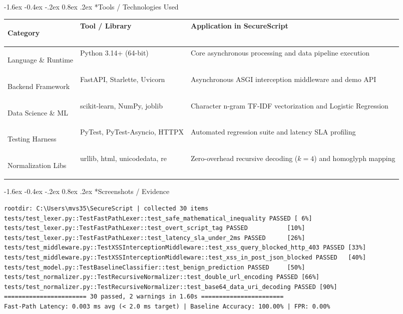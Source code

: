\documentclass[11pt,a4paper]{article}
\makeatletter
\renewcommand{\section}{\@startsection{section}{1}{\z@}%
  {-1.6ex \@plus -0.4ex \@minus -.2ex}%
  {0.8ex \@plus .2ex}%
  {\normalfont\large\bfseries\color{primaryblue}}}
\makeatother
\begin{document}
\section*{Tools / Technologies Used}
\begin{table}[htbp]
\centering
\footnotesize
\begin{tabularx}{\textwidth}{>{\bfseries\raggedright\arraybackslash}p{2.8cm} >{\raggedright\arraybackslash}p{3.8cm} >{\raggedright\arraybackslash}X}
\toprule
\textbf{Category} & \textbf{Tool / Library} & \textbf{Application in SecureScript} \\
\midrule
Language \& Runtime & Python 3.14+ (64-bit) & Core asynchronous processing and data pipeline execution \\
Backend Framework & FastAPI, Starlette, Uvicorn & Asynchronous ASGI interception middleware and demo API \\
Data Science \& ML & scikit-learn, NumPy, joblib & Character n-gram TF-IDF vectorization and Logistic Regression \\
Testing Harness & PyTest, PyTest-Asyncio, HTTPX & Automated regression suite and latency SLA profiling \\
Normalization Libs & urllib, html, unicodedata, re & Zero-overhead recursive decoding ($k=4$) and homoglyph mapping \\
\bottomrule
\end{tabularx}
\end{table}

\vspace{-0.6em}

\section*{Screenshots / Evidence}
\begin{lstlisting}[caption={Automated Pytest Execution & Latency SLA Verification Log}]
rootdir: C:\Users\mvs35\SecureScript | collected 30 items
tests/test_lexer.py::TestFastPathLexer::test_safe_mathematical_inequality PASSED [ 6%]
tests/test_lexer.py::TestFastPathLexer::test_overt_script_tag PASSED           [10%]
tests/test_lexer.py::TestFastPathLexer::test_latency_sla_under_2ms PASSED      [26%]
tests/test_middleware.py::TestXSSInterceptionMiddleware::test_xss_query_blocked_http_403 PASSED [33%]
tests/test_middleware.py::TestXSSInterceptionMiddleware::test_xss_in_post_json_blocked PASSED   [40%]
tests/test_model.py::TestBaselineClassifier::test_benign_prediction PASSED     [50%]
tests/test_normalizer.py::TestRecursiveNormalizer::test_double_url_encoding PASSED [66%]
tests/test_normalizer.py::TestRecursiveNormalizer::test_base64_data_uri_decoding PASSED [90%]
======================= 30 passed, 2 warnings in 1.60s =======================
Fast-Path Latency: 0.003 ms avg (< 2.0 ms target) | Baseline Accuracy: 100.00% | FPR: 0.00%
\end{lstlisting}
\end{document}
